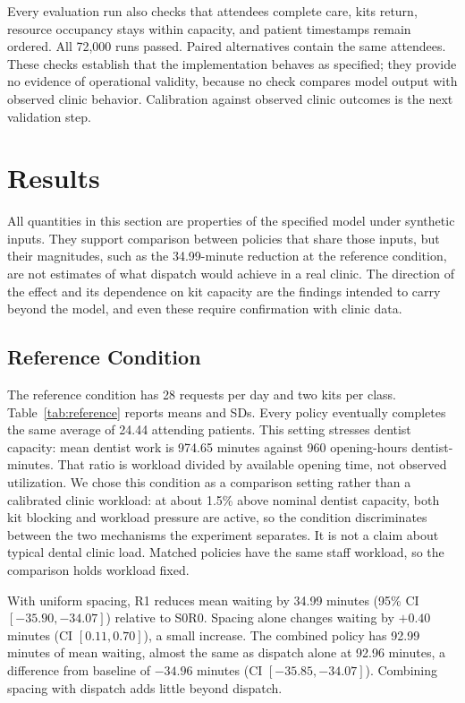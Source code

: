 \documentclass[conference]{IEEEtran}
\begin{document}
Every evaluation run also checks that attendees complete care, kits return, resource occupancy stays within capacity, and patient timestamps remain ordered. All 72,000 runs passed. Paired alternatives contain the same attendees. These checks establish that the implementation behaves as specified; they provide no evidence of operational validity, because no check compares model output with observed clinic behavior. Calibration against observed clinic outcomes is the next validation step.

\section{Results}\label{sec:results}
All quantities in this section are properties of the specified model under synthetic inputs. They support comparison between policies that share those inputs, but their magnitudes, such as the 34.99-minute reduction at the reference condition, are not estimates of what dispatch would achieve in a real clinic. The direction of the effect and its dependence on kit capacity are the findings intended to carry beyond the model, and even these require confirmation with clinic data.

\subsection{Reference Condition}\label{subsec:reference}
The reference condition has 28 requests per day and two kits per class. Table~\ref{tab:reference} reports means and SDs. Every policy eventually completes the same average of 24.44 attending patients. This setting stresses dentist capacity: mean dentist work is 974.65 minutes against 960 opening-hours dentist-minutes. That ratio is workload divided by available opening time, not observed utilization. We chose this condition as a comparison setting rather than a calibrated clinic workload: at about 1.5\% above nominal dentist capacity, both kit blocking and workload pressure are active, so the condition discriminates between the two mechanisms the experiment separates. It is not a claim about typical dental clinic load. Matched policies have the same staff workload, so the comparison holds workload fixed.

With uniform spacing, R1 reduces mean waiting by 34.99 minutes (95\% CI $[-35.90,-34.07]$) relative to S0R0. Spacing alone changes waiting by $+0.40$ minutes (CI $[0.11,0.70]$), a small increase. The combined policy has 92.99 minutes of mean waiting, almost the same as dispatch alone at 92.96 minutes, a difference from baseline of $-34.96$ minutes (CI $[-35.85,-34.07]$). Combining spacing with dispatch adds little beyond dispatch.
\end{document}
